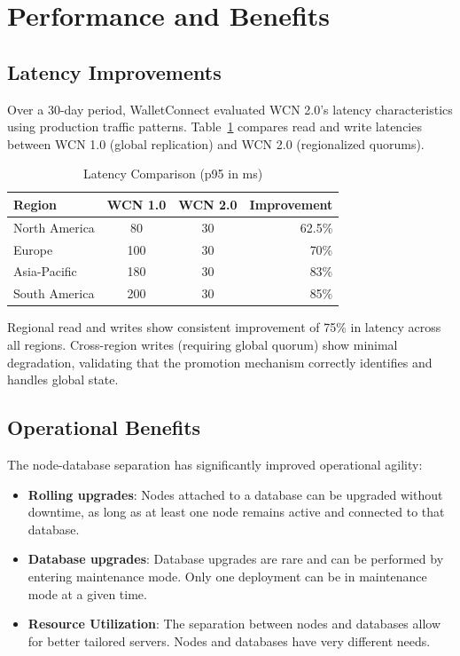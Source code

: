 \documentclass[10pt,twocolumn]{article}
\begin{document}
\section{Performance and Benefits}

\subsection{Latency Improvements}

Over a 30-day period, WalletConnect evaluated WCN 2.0's latency characteristics using production traffic patterns. Table~\ref{tab:latency} compares read and write latencies between WCN 1.0 (global replication) and WCN 2.0 (regionalized quorums).

\begin{table}[h]
\centering
\caption{Latency Comparison (p95 in ms)}
\label{tab:latency}
\begin{tabular}{@{}lccr@{}}
\toprule
Region        & WCN 1.0 & WCN 2.0 & Improvement \\
\midrule
North America & 80      & 30      & 62.5\% \\
Europe        & 100     & 30      & 70\%   \\
Asia-Pacific  & 180     & 30      & 83\%   \\
South America & 200     & 30      & 85\%   \\
\bottomrule
\end{tabular}
\end{table}

Regional read and writes show consistent improvement of 75\% in latency across all regions. Cross-region writes (requiring global quorum) show minimal degradation, validating that the promotion mechanism correctly identifies and handles global state.

\subsection{Operational Benefits}

The node-database separation has significantly improved operational agility:

\begin{itemize}
    \item \textbf{Rolling upgrades}: Nodes attached to a database can be upgraded without downtime, as long as at least one node remains active and connected to that database.
    \item \textbf{Database upgrades}: Database upgrades are rare and can be performed by entering maintenance mode. Only one deployment can be in maintenance mode at a given time.
    \item \textbf{Resource Utilization}: The separation between nodes and databases allow for better tailored servers. Nodes and databases have very different needs.
\end{itemize}
\end{document}
